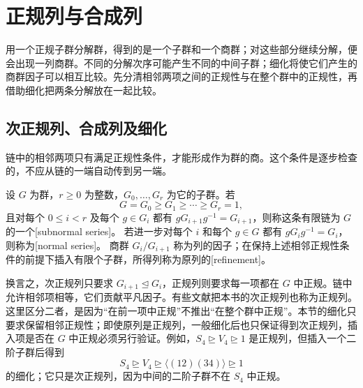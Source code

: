 
\section{正规列与合成列}
\label{b1:sec:0701}

用一个正规子群分解群，得到的是一个子群和一个商群；对这些部分继续分解，便会出现一列商群。不同的分解次序可能产生不同的中间子群；细化将使它们产生的商群因子可以相互比较。先分清相邻两项之间的正规性与在整个群中的正规性，再借助细化把两条分解放在一起比较。

%
%

\subsection{次正规列、合成列及细化}
\label{b1:subsec:0701:01}

链中的相邻两项只有满足正规性条件，才能形成作为群的商。这个条件是逐步检查的，不应从链的一端自动传到另一端。

\begin{definition}\label{b1:def:subnormal-series}
	设 \(G\) 为群，\(r\ge0\) 为整数，\(G_0,\ldots,G_r\) 为它的子群。若
	\[
		G=G_0\ge G_1\ge\cdots\ge G_r=1,
	\]
	且对每个 \(0\le i<r\) 及每个 \(g\in G_i\) 都有 \(gG_{i+1}g^{-1}=G_{i+1}\)，则称这条有限链为 \(G\) 的一个[subnormal series]。 若进一步对每个 \(i\) 和每个 \(g\in G\) 都有 \(gG_ig^{-1}=G_i\)，则称为[normal series]。 商群 \(G_i/G_{i+1}\) 称为列的因子；在保持上述相邻正规性条件的前提下插入有限个子群，所得列称为原列的[refinement]。
\end{definition}

换言之，次正规列只要求 \(G_{i+1}\trianglelefteq G_i\)，正规列则要求每一项都在 \(G\) 中正规。链中允许相邻项相等，它们贡献平凡因子。有些文献把本书的次正规列也称为正规列。这里区分二者，是因为“在前一项中正规”不推出“在整个群中正规”。本节的细化只要求保留相邻正规性；即使原列是正规列，一般细化后也只保证得到次正规列，插入项是否在 \(G\) 中正规必须另行验证。例如，\(S_4\trianglerighteq V_4\trianglerighteq1\) 是正规列，但插入一个二阶子群后得到
\[
	S_4\trianglerighteq V_4\trianglerighteq \bigl\langle(12)(34)\bigr\rangle\trianglerighteq1
\]
的细化；它只是次正规列，因为中间的二阶子群不在 \(S_4\) 中正规。

